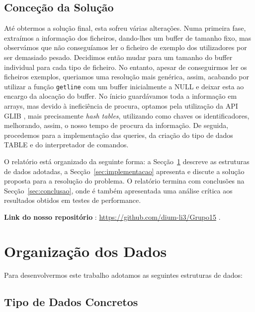 \documentclass[a4paper]{article}
\begin{document}
\subsection{Conceção da Solução}
\label{sec:solucao}

Até obtermos a solução final, esta sofreu várias alterações. Numa primeira fase,
extraímos a informação dos ficheiros, dando-lhes um buffer de tamanho fixo, 
mas observámos que não conseguíamos ler o ficheiro de exemplo dos utilizadores por ser demasiado pesado. 
Decidimos então mudar para um tamanho do buffer individual para cada tipo de ficheiro. No entanto, apesar de conseguirmos ler os ficheiros exemplos, queriamos uma resolução mais genérica, assim, acabando por utilizar a função \texttt{getline}\cite{getline} com um buffer inicialmente a NULL e deixar esta ao encargo da alocação do buffer. No ínicio guardávamos toda a informação em arrays, mas devido à ineficiência de procura, optamos pela utilização da API GLIB \cite{glib}, mais precisamente \textit{hash tables}, utilizando como chaves os identificadores, melhorando, assim, o nosso tempo de procura da informação. De seguida, procedemos para a implementação das queries, da criação do tipo de dados TABLE e do interpretador de comandos. \par

O relatório está organizado da seguinte forma: a
Secção~\ref{sec:estruturadedados} descreve as estruturas de dados adotadas,
a Secção~\ref{sec:implementacao}  apresenta e discute a solução proposta para a resolução do problema. 
O relatório termina com conclusões na
Secção~\ref{sec:conclusao}, onde é também apresentada uma análise crítica aos
resultados obtidos em testes de performance. \par
      \vspace{0.25cm}
\textbf{Link do nosso repositório }:  \url{https://github.com/dium-li3/Grupo15} \cite{github}. \par


\section{Organização dos Dados}
\label{sec:estruturadedados}

Para desenvolvermos este trabalho adotamos as seguintes estruturas de dados:

\subsection{Tipo de Dados Concretos}
\label{sec:dados_concretos}
\end{document}
